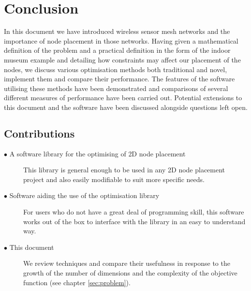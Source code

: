 \section{Conclusion}
\label{sec:conclusion}

In this document we have introduced wireless sensor mesh networks and the importance of node placement in those networks. Having given a mathematical definition of the problem and a practical definition in the form of the indoor museum example and detailing how constraints may affect our placement of the nodes, we discuss various optimisation methods both traditional and novel, implement them and compare their performance. The features of the software utilising these methods have been demonstrated and comparisons of several different measures of performance have been carried out. Potential extensions to this document and the software have been discussed alongside questions left open.
\subsection{Contributions} 
	\label{sec:conclusion_contribs} 
	
		\begin{description}	
		
			\item[$\bullet$ A software library for the optimising of 2D node placement]\hfill
			
			This library is general enough to be used in any 2D node placement project and also easily modifiable to suit more specific needs.
			
			\item[$\bullet$ Software aiding the use of the optimisation library]\hfill
			
			For users who do not have a great deal of programming skill, this software works out of the box to interface with the library in an easy to understand way.
			
			\item[$\bullet$ This document]\hfill
						
			We review techniques and compare their usefulness in response to the growth of the number of dimensions and the complexity of the objective function (see chapter \ref{sec:problem}).
			
		\end{description}